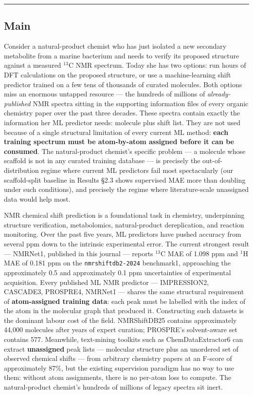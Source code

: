 \documentclass[
]{article}
\begin{document}
\begin{center}\rule{0.5\linewidth}{0.5pt}\end{center}

\subsection{Main}\label{main}

Consider a natural-product chemist who has just isolated a new secondary
metabolite from a marine bacterium and needs to verify its proposed
structure against a measured \(^{13}\)C NMR spectrum. Today she has two
options: run hours of DFT calculations on the proposed structure, or use
a machine-learning shift predictor trained on a few tens of thousands of
curated molecules. Both options miss an enormous untapped resource ---
the hundreds of millions of \emph{already-published} NMR spectra sitting
in the supporting information files of every organic chemistry paper
over the past three decades. These spectra contain exactly the
information her ML predictor needs: molecule plus shift list. They are
not used because of a single structural limitation of every current ML
method: \textbf{each training spectrum must be atom-by-atom assigned
before it can be consumed}. The natural-product chemist's specific
problem --- a molecule whose scaffold is not in any curated training
database --- is precisely the out-of-distribution regime where current
ML predictors fail most spectacularly (our scaffold-split baseline in
Results §2.3 shows supervised MAE more than doubling under such
conditions), and precisely the regime where literature-scale unassigned
data would help most.

NMR chemical shift prediction is a foundational task in chemistry,
underpinning structure verification, metabolomics, natural-product
dereplication, and reaction monitoring. Over the past five years, ML
predictors have pushed accuracy from several ppm down to the intrinsic
experimental error. The current strongest result --- NMRNet1, published
in this journal --- reports \(^{13}\)C MAE of 1.098 ppm and \(^1\)H MAE
of 0.181 ppm on the \texttt{nmrshiftdb2-2024} benchmark1, approaching
the approximately 0.5 and approximately 0.1 ppm uncertainties of
experimental acquisition. Every published ML NMR predictor ---
IMPRESSION2, CASCADE3, PROSPRE4, NMRNet1 --- shares the same structural
requirement of \textbf{atom-assigned training data}: each peak must be
labelled with the index of the atom in the molecular graph that produced
it. Constructing such datasets is the dominant labour cost of the field.
NMRShiftDB25 contains approximately 44,000 molecules after years of
expert curation; PROSPRE's solvent-aware set contains 577. Meanwhile,
text-mining toolkits such as ChemDataExtractor6 can extract
\textbf{unassigned} peak lists --- molecular structure plus an unordered
set of observed chemical shifts --- from arbitrary chemistry papers at
an F-score of approximately 87\%, but the existing supervision paradigm
has no way to use them: without atom assignments, there is no per-atom
loss to compute. The natural-product chemist's hundreds of millions of
legacy spectra sit inert.
\end{document}
